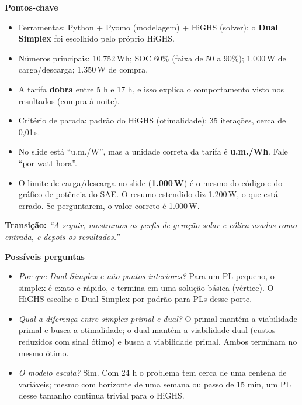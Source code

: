 \documentclass[11pt,a4paper]{article}
\newcommand{\transicao}[1]{\noindent\textbf{Transição:} \emph{#1}}
\begin{document}
\noindent\textbf{Pontos-chave}
\begin{itemize}
  \item Ferramentas: Python + Pyomo (modelagem) + HiGHS (solver); o \textbf{Dual Simplex} foi escolhido pelo próprio HiGHS.
  \item Números principais: 10.752\,Wh; SOC 60\% (faixa de 50 a 90\%); 1.000\,W de carga/descarga; 1.350\,W de compra.
  \item A tarifa \textbf{dobra} entre 5 h e 17 h, e isso explica o comportamento visto nos resultados (compra à noite).
  \item Critério de parada: padrão do HiGHS (otimalidade); 35 iterações, cerca de 0,01\,s.
\end{itemize}

\begin{alerta}
\begin{itemize}[leftmargin=12pt]
  \item No slide está ``u.m./W'', mas a unidade correta da tarifa é \textbf{u.m./Wh}. Fale ``por watt-hora''.
  \item O limite de carga/descarga no slide (\textbf{1.000\,W}) é o mesmo do código e do gráfico de potência do SAE.
        O resumo estendido diz 1.200\,W, o que está errado. Se perguntarem, o valor correto é 1.000\,W.
\end{itemize}
\end{alerta}

\transicao{``A seguir, mostramos os perfis de geração solar e eólica usados como entrada, e depois os resultados.''}

\medskip
\noindent\textbf{Possíveis perguntas}
\begin{itemize}
  \item \emph{Por que Dual Simplex e não pontos interiores?} Para um PL pequeno, o simplex é exato e rápido, e
        termina em uma solução básica (vértice). O HiGHS escolhe o Dual Simplex por padrão para PLs desse porte.
  \item \emph{Qual a diferença entre simplex primal e dual?} O primal mantém a viabilidade primal e busca a
        otimalidade; o dual mantém a viabilidade dual (custos reduzidos com sinal ótimo) e busca a viabilidade primal.
        Ambos terminam no mesmo ótimo.
  \item \emph{O modelo escala?} Sim. Com 24 h o problema tem cerca de uma centena de variáveis; mesmo com
        horizonte de uma semana ou passo de 15 min, um PL desse tamanho continua trivial para o HiGHS.
\end{itemize}
\end{document}
